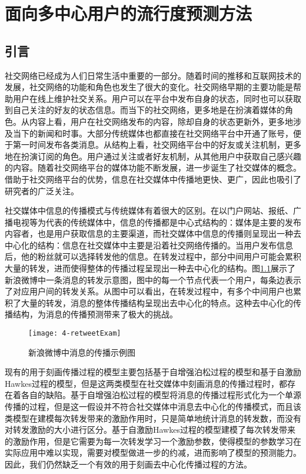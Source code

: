 \chapter{面向多中心用户的流行度预测方法}
\label{chap:four}
\section{引言}
社交网络已经成为人们日常生活中重要的一部分。随着时间的推移和互联网技术的发展，社交网络的功能和角色也发生了很大的变化。社交网络早期的主要功能是帮助用户在线上维护社交关系。用户可以在平台中发布自身的状态，同时也可以获取到自己关注的好友的状态信息。而当下的社交网络，更多地是在扮演着媒体的角色。从内容上看，用户在社交网络发布的内容，除却自身的状态更新外，更多地涉及当下的新闻和时事。大部分传统媒体也都直接在社交网络平台中开通了账号，便于第一时间发布各类消息。从结构上看，社交网络平台中的好友或关注机制，更多地在扮演订阅的角色。用户通过关注或者好友机制，从其他用户中获取自己感兴趣的内容。随着社交网络平台的媒体功能不断发展，进一步诞生了社交媒体的概念。借助于社交网络平台的优势，信息在社交媒体中传播地更快、更广，因此也吸引了研究者的广泛关注。

社交媒体中信息的传播模式与传统媒体有着很大的区别。在以门户网站、报纸、广播电视等为代表的传统媒体中，信息的传播都是中心式结构的：媒体是主要的发布内容者，也是用户获取信息的主要渠道，而社交媒体中信息的传播则呈现出一种去中心化的结构：信息在社交媒体中主要是沿着社交网络传播的。当用户发布信息后，他的粉丝就可以选择转发他的信息。在转发过程中，部分中间用户可能会累积大量的转发，进而使得整体的传播过程呈现出一种去中心化的结构。图\ref{fig:retweetExam}展示了新浪微博中一条消息的转发示意图，图中的每一个节点代表一个用户，每条边表示了对应用户间的转发关系。从图中可以看出，在转发过程中，有多个中间用户也累积了大量的转发，消息的整体传播结构呈现出去中心化的特点。这种去中心化的传播结构，为消息的传播预测带来了极大的挑战。
\begin{figure}[!htbp]
  \centering
  \texttt{[image: 4-retweetExam]}
  \caption{新浪微博中消息的传播示例图}
  \label{fig:retweetExam}
\end{figure}

现有的用于刻画传播过程的模型主要包括基于自增强泊松过程的模型\citep{shen2014modeling,gao2015modeling}和基于自激励Hawkes过程的模型\citep{bao2015modeling,zhao2015seismic}，但是这两类模型在社交媒体中刻画消息的传播过程时，都存在着各自的缺陷。基于自增强泊松过程的模型将消息的传播过程形式化为一个单源传播的过程，但是这一假设并不符合社交媒体中消息去中心化的传播模式，而且该类模型在建模每次转发带来的激励作用时，只是简单地统计消息的转发数，而没有对转发激励的大小进行区分。基于自激励Hawkes过程的模型建模了每次转发带来的激励作用，但是它需要为每一次转发学习一个激励参数，使得模型的参数学习在实际应用中难以实现，需要对模型做进一步的约减，进而影响了模型的预测能力。因此，我们仍然缺乏一个有效的用于刻画去中心化传播过程的方法。

